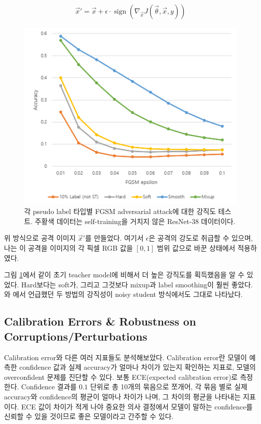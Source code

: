 \begin{align*} 
  \vec x' = \vec x + \epsilon \cdot \operatorname{sign}(\nabla_{\vec x} J(\vec \theta, \vec x, y))
\end{align*}
\begin{figure}[!htb]
  \centering
  \includegraphics[width=.6\textwidth]{../figz/FGSM}
  \caption{각 pseudo label 타입별 FGSM adversarial attack에 대한 강직도 테스트. 주황색 데이터는 self-training을 거치지 않은 ResNet-38 데이터이다.}
  \label{fgsm}
\end{figure}

위 방식으로 공격 이미지 $\vec x'$를 만들었다. 여기서 $\epsilon$은 공격의 강도로 취급할 수 있으며, 나는 이 공격을 이미지의 각 픽셀 RGB 값을 $[0, 1]$ 범위 값으로 바꾼 상태에서 적용하였다.

그림 \ref{fgsm}에서 같이 초기 teacher model에 비해서 더 높은 강직도를 획득했음을 알 수 있었다. Hard보다는 soft가, 그리고 그것보다 mixup과 label smoothing이 훨씬 좋았다. \cite{goibert2019adversarial}와 \cite{zhang2018mixup}에서 언급했던 두 방법의 강직성이 noisy student 방식에서도 그대로 나타났다.

\subsection{Calibration Errors \& Robustness on Corruptions/Perturbations} Calibration error와 다른 여러 지표들도 분석해보았다. Calibration error란 모델이 예측한 confidence 값과 실제 accuracy가 얼마나 차이가 있는지 확인하는 지표로, 모델의 overconfident 문제를 진단할 수 있다. \cite{guo2017calibration} 보통 ECE(expected calibration error)로 측정한다. Confidence 결과를 $0.1$ 단위로 총 10개의 묶음으로 쪼개어, 각 묶음 별로 실제 accuracy와 confidence의 평균이 얼마나 차이가 나며, 그 차이의 평균을 나타내는 지표이다. ECE 값이 차이가 적게 나야 중요한 의사 결정에서 모델이 말하는 confidence를 신뢰할 수 있을 것이므로 좋은 모델이라고 간주할 수 있다.

